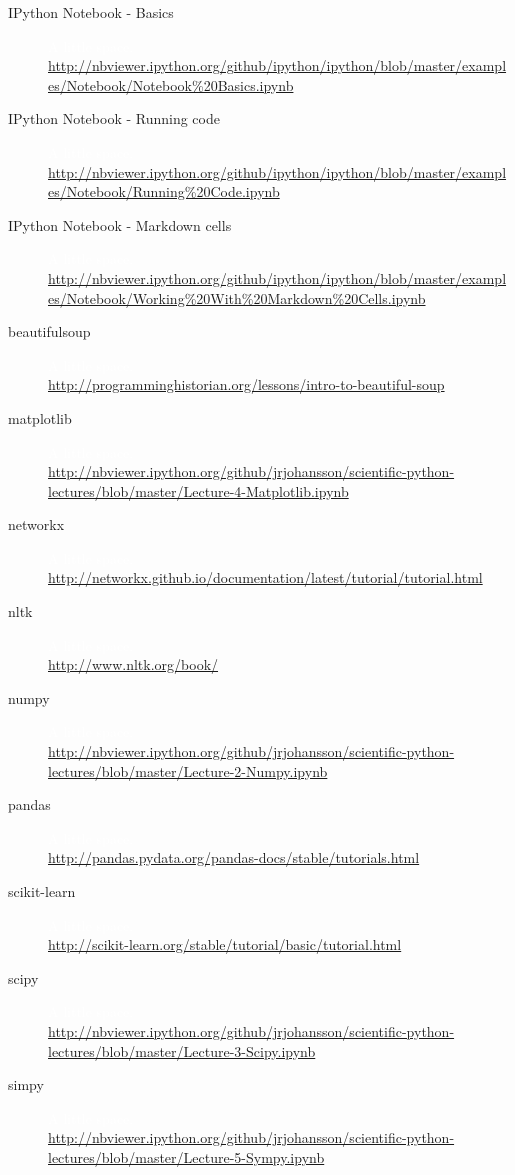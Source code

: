 \begin{description}
\item[IPython Notebook - Basics] \textcolor{white}{A little space.} \\
\url{http://nbviewer.ipython.org/github/ipython/ipython/blob/master/examples/Notebook/Notebook\%20Basics.ipynb}

\item[IPython Notebook - Running code] \textcolor{white}{A little space.} \\
\url{http://nbviewer.ipython.org/github/ipython/ipython/blob/master/examples/Notebook/Running\%20Code.ipynb}

\item[IPython Notebook - Markdown cells] \textcolor{white}{A little space.} \\
\url{http://nbviewer.ipython.org/github/ipython/ipython/blob/master/examples/Notebook/Working\%20With\%20Markdown\%20Cells.ipynb}

\item[beautifulsoup] \textcolor{white}{A little space.} \\
\url{http://programminghistorian.org/lessons/intro-to-beautiful-soup}

\item[matplotlib] \textcolor{white}{A little space.} \\
\url{http://nbviewer.ipython.org/github/jrjohansson/scientific-python-lectures/blob/master/Lecture-4-Matplotlib.ipynb}

\item[networkx] \textcolor{white}{A little space.} \\
\url{http://networkx.github.io/documentation/latest/tutorial/tutorial.html}

\item[nltk] \textcolor{white}{A little space.} \\
\url{http://www.nltk.org/book/}

\item[numpy] \textcolor{white}{A little space.} \\
\url{http://nbviewer.ipython.org/github/jrjohansson/scientific-python-lectures/blob/master/Lecture-2-Numpy.ipynb}

\item[pandas] \textcolor{white}{A little space.} \\
\url{http://pandas.pydata.org/pandas-docs/stable/tutorials.html}

\item[scikit-learn] \textcolor{white}{A little space.} \\
\url{http://scikit-learn.org/stable/tutorial/basic/tutorial.html}

\item[scipy] \textcolor{white}{A little space.} \\
\url{http://nbviewer.ipython.org/github/jrjohansson/scientific-python-lectures/blob/master/Lecture-3-Scipy.ipynb}

\item[simpy] \textcolor{white}{A little space.} \\
\url{http://nbviewer.ipython.org/github/jrjohansson/scientific-python-lectures/blob/master/Lecture-5-Sympy.ipynb}
\end{description}

